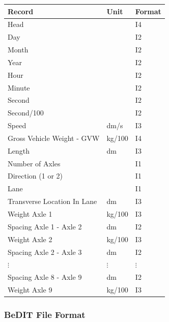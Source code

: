 \documentclass[
]{article}
\begin{document}
\begin{longtable}[]{@{}
  >{\raggedright\arraybackslash}p{}
  >{\centering\arraybackslash}p{}
  >{\centering\arraybackslash}p{}@{}}
\toprule\noalign{}
\begin{minipage}[b]{\linewidth}\centering
\textbf{Record}
\end{minipage} & \begin{minipage}[b]{\linewidth}\centering
\textbf{Unit}
\end{minipage} & \begin{minipage}[b]{\linewidth}\centering
\textbf{Format}
\end{minipage} \\
\midrule\noalign{}
\endhead
\bottomrule\noalign{}
\endlastfoot
Head & & I4 \\
Day & & I2 \\
Month & & I2 \\
Year & & I2 \\
Hour & & I2 \\
Minute & & I2 \\
Second & & I2 \\
Second/100 & & I2 \\
Speed & dm/s & I3 \\
Gross Vehicle Weight - GVW & kg/100 & I4 \\
Length & dm & I3 \\
Number of Axles & & I1 \\
Direction (1 or 2) & & I1 \\
Lane & & I1 \\
Transverse Location In Lane & dm & I3 \\
Weight Axle 1 & kg/100 & I3 \\
Spacing Axle 1 - Axle 2 & dm & I2 \\
Weight Axle 2 & kg/100 & I3 \\
Spacing Axle 2 - Axle 3 & dm & I2 \\
$\vdots$
&
$\vdots$
&
$\vdots$ \\
Spacing Axle 8 - Axle 9 & dm & I2 \\
Weight Axle 9 & kg/100 & I3 \\
\end{longtable}

\subsubsection*{\texorpdfstring{\hfill\break
BeDIT File Format }{ BeDIT File Format }}\label{bedit-file-format}
\end{document}

